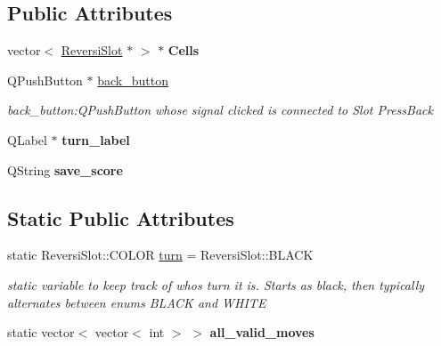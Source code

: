 \subsection*{Public Attributes}
\begin{DoxyCompactItemize}
\item 
\mbox{\label{classGame2Grid_a7ea67a012555b1d0ebb399f8dc5727f7}} 
vector$<$ \hyperlink{classReversiSlot}{Reversi\+Slot} $\ast$ $>$ $\ast$ {\bfseries Cells}
\item 
\mbox{\label{classGame2Grid_af6253e3276dc0761176754d7b809bbe0}} 
Q\+Push\+Button $\ast$ \hyperlink{classGame2Grid_af6253e3276dc0761176754d7b809bbe0}{back\+\_\+button}
\begin{DoxyCompactList}\small\item\em back\+\_\+button\+:Q\+Push\+Button whose signal clicked is connected to Slot Press\+Back \end{DoxyCompactList}\item 
\mbox{\label{classGame2Grid_a8fa6b4617803602470c056b31d637f31}} 
Q\+Label $\ast$ {\bfseries turn\+\_\+label}
\item 
\mbox{\label{classGame2Grid_a7928ebdf454b758fc661ad9165b8dc91}} 
Q\+String {\bfseries save\+\_\+score}
\end{DoxyCompactItemize}
\subsection*{Static Public Attributes}
\begin{DoxyCompactItemize}
\item 
static Reversi\+Slot\+::\+C\+O\+L\+OR \hyperlink{classGame2Grid_a1b09031451ce6d9644e40d7e7a36697e}{turn} = Reversi\+Slot\+::\+B\+L\+A\+CK
\begin{DoxyCompactList}\small\item\em static variable to keep track of who\textquotesingle{}s turn it is. Starts as black, then typically alternates between enums B\+L\+A\+CK and W\+H\+I\+TE \end{DoxyCompactList}\item 
\mbox{\label{classGame2Grid_a8cceb431251ac1f4583aaf2698265efb}} 
static vector$<$ vector$<$ int $>$ $>$ {\bfseries all\+\_\+valid\+\_\+moves}
\end{DoxyCompactItemize}


